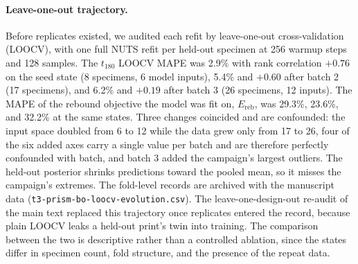 \documentclass[11pt]{article}
\begin{document}
\paragraph{Leave-one-out trajectory.} Before replicates existed, we
audited each refit by leave-one-out cross-validation (LOOCV), with one
full NUTS refit per held-out specimen at 256 warmup steps and 128
samples. The $t_{180}$ LOOCV MAPE was 2.9\% with rank correlation
$+0.76$ on the seed state (8 specimens, 6 model inputs), 5.4\% and
$+0.60$ after batch 2 (17 specimens), and 6.2\% and $+0.19$ after batch 3
(26 specimens, 12 inputs). The MAPE of the rebound objective the model
was fit on, $E_{\mathrm{reb}}$, was 29.3\%, 23.6\%, and 32.2\% at the
same states. Three changes coincided and are confounded: the input space
doubled from 6 to 12 while the data grew only from 17 to 26, four of the
six added axes carry a single value per batch and are therefore
perfectly confounded with batch, and batch 3 added the campaign's largest
outliers. The held-out posterior shrinks predictions toward the pooled
mean, so it misses the campaign's extremes. The fold-level records are
archived with the manuscript data
(\texttt{t3-prism-bo-loocv-evolution.csv}). The leave-one-design-out
re-audit of the main text replaced this trajectory once replicates
entered the record, because plain LOOCV leaks a held-out print's twin
into training. The comparison between the two is descriptive rather than
a controlled ablation, since the states differ in specimen count, fold
structure, and the presence of the repeat data.
\end{document}
